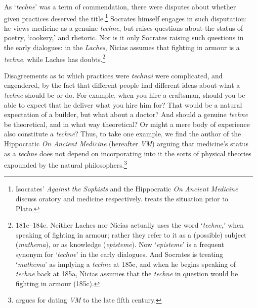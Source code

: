 ﻿\documentclass[11pt]{amsart}
\begin{document}



As `\emph{techne}' was a term of commendation, there were disputes about whether given practices deserved the title.\footnote{Isocrates' \emph{Against the Sophists} and the Hippocratic \emph{On Ancient Medicine} discuss oratory and medicine respectively. \citet{heinimann1961vpt} treats the situation prior to Plato.} Socrates himself engages in such disputation: he views medicine as a genuine \emph{techne}, but raises questions about the status of poetry, `cookery,' and rhetoric. Nor is it only Socrates raising such questions in the early dialogues: in the \emph{Laches}, Nicias assumes that fighting in armour is a \emph{techne}, while Laches has doubts.\footnote{181e--184c. Neither Laches nor Nicias actually uses the word `\emph{techne,}' when speaking of fighting in armour; rather they refer to it as a (possible) subject (\emph{mathema}), or as knowledge (\emph{episteme}). Now `\emph{episteme}' is a frequent synonym for `\emph{techne}' in the early dialogues. And Socrates is treating `\emph{mathema}' as implying a \emph{techne} at 185e, and when he begins speaking of \emph{techne} back at 185a, Nicias assumes that the \emph{techne} in question would be fighting in armour (185c).}

Disagreements as to which practices were \emph{technai} were complicated, and engendered, by the fact that different people had different ideas about what a \emph{techne} should be or do. For example, when you hire a craftsman, should you be able to expect that he deliver what you hire him for? That would be a natural expectation of a builder, but what about a doctor? And should a genuine \emph{techne} be theoretical, and in what way theoretical? Or might a mere body of experience also constitute a \emph{techne}? Thus, to take one example, we find the author of the Hippocratic \emph{On Ancient Medicine} (hereafter \emph{VM}) arguing that medicine's status as a \emph{techne} does not depend on incorporating into it the sorts of physical theories expounded by the natural philosophers.\footnote{\citet[63--4]{schiefsky2005} argues for dating \emph{VM} to the late fifth century.}


\end{document}
